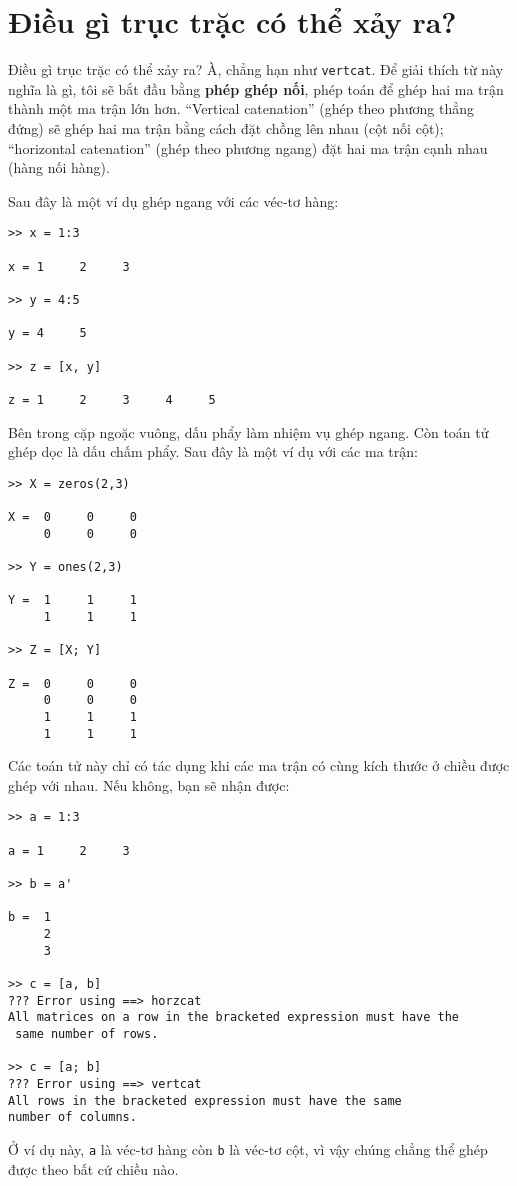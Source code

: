 \documentclass[12pt]{book}
\begin{document}
\section{Điều gì trục trặc có thể xảy ra?}

Điều gì trục trặc có thể xảy ra?  À, chẳng hạn như {\tt vertcat}.
Để giải thích từ này nghĩa là gì, tôi sẽ bắt đầu bằng 
{\bf phép ghép nối}, phép toán để ghép hai ma trận thành
một ma trận lớn hơn. ``Vertical catenation'' (ghép theo
phương thẳng đứng) sẽ ghép hai ma trận bằng cách đặt
chồng lên nhau (cột nối cột); ``horizontal catenation'' 
(ghép theo phương ngang) đặt hai ma trận cạnh nhau
(hàng nối hàng).

Sau đây là một ví dụ ghép ngang với các véc-tơ hàng:

\begin{verbatim}
>> x = 1:3

x = 1     2     3

>> y = 4:5

y = 4     5

>> z = [x, y]

z = 1     2     3     4     5
\end{verbatim}
%
Bên trong cặp ngoặc vuông, dấu phẩy làm nhiệm vụ ghép ngang.
Còn toán tử ghép dọc là dấu chấm phẩy. Sau đây là một ví dụ với
các ma trận:

\begin{verbatim}
>> X = zeros(2,3)

X =  0     0     0
     0     0     0

>> Y = ones(2,3)

Y =  1     1     1
     1     1     1

>> Z = [X; Y]

Z =  0     0     0
     0     0     0
     1     1     1
     1     1     1
\end{verbatim}
%
Các toán tử này chỉ có tác dụng khi các ma trận có cùng kích thước
ở chiều được ghép với nhau. Nếu không, bạn sẽ nhận được:

\begin{verbatim}
>> a = 1:3

a = 1     2     3

>> b = a'

b =  1
     2
     3

>> c = [a, b]
??? Error using ==> horzcat
All matrices on a row in the bracketed expression must have the 
 same number of rows.

>> c = [a; b]
??? Error using ==> vertcat
All rows in the bracketed expression must have the same 
number of columns.
\end{verbatim}
%
Ở ví dụ này, {\tt a} là véc-tơ hàng còn {\tt b} là véc-tơ cột,
vì vậy chúng chẳng thể ghép được theo bất cứ chiều nào.
\end{document}
